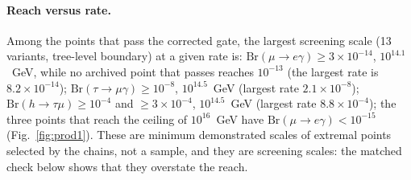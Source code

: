 \documentclass[twocolumn,epjc3]{svjour3}
\newcommand{\Br}{\mathrm{Br}}
\begin{document}
\paragraph{Reach versus rate.} Among the points that pass the corrected gate, the largest screening scale (13 variants, tree-level boundary) at a given rate is: $\Br(\mu\to e\gamma)\ge3\times10^{-14}$, $10^{14.1}$~GeV, while no archived point that passes reaches $10^{-13}$ (the largest rate is $8.2\times10^{-14}$); $\Br(\tau\to\mu\gamma)\ge10^{-8}$, $10^{14.5}$~GeV (largest rate $2.1\times10^{-8}$); $\Br(h\to\tau\mu)\ge10^{-4}$ and $\ge3\times10^{-4}$, $10^{14.5}$~GeV (largest rate $8.8\times10^{-4}$); the three points that reach the ceiling of $10^{16}$~GeV have $\Br(\mu\to e\gamma)<10^{-15}$ (Fig.~\ref{fig:prod1}). These are minimum demonstrated scales of extremal points selected by the chains, not a sample, and they are screening scales: the matched check below shows that they overstate the reach.
\end{document}
